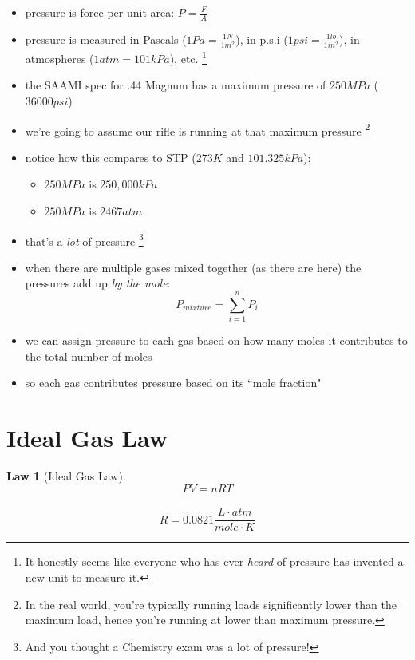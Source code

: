 \documentclass[11pt, oneside]{article}   	%
\newtheorem{law}{Law}
\begin{document}
\begin{itemize}

\item pressure is force per unit area: $P = \frac{F}{A}$
\item pressure is measured in Pascals ($1 Pa = \frac{1 N}{1 m^{2}}$), in p.s.i ($1 psi = \frac{1 lb}{1 in^{2}}$), in atmospheres ($1 atm = 101 kPa$), etc.
\footnote{It honestly seems like everyone who has ever \emph{heard} of pressure has invented a new unit to measure it.}
\item the SAAMI spec for .44 Magnum has a maximum pressure of  $250 MPa$ ($36000 psi$) 
\item we're going to assume our rifle is running at that maximum pressure
\footnote{In the real world, you're typically running loads significantly lower than the maximum load, hence you're running at lower than maximum pressure.}
\item notice how this compares to STP ($273 K$ and $101.325 kPa$):
\begin{itemize}
\item $250 MPa$ is $250,000 kPa$
\item $250 MPa$ is $2467 atm$
\end{itemize}

\item that's a \emph{lot} of pressure
\footnote{And you thought a Chemistry exam was a lot of pressure!}
\item when there are multiple gases mixed together (as there are here) the pressures add up \emph{by the mole}:\\
$$P_{mixture} = \sum^{n}_{i=1} P_{i} $$
\item we can assign pressure to each gas based on how many moles it contributes to the total number of moles
\item so each gas contributes pressure based on its ``mole fraction"
\end{itemize}

\section{Ideal Gas Law}

\begin{law}[Ideal Gas Law]\label{law:ideal-gas}
$$P V = n R T$$ \\
$$ R = 0.0821 \frac{L \cdot atm}{mole \cdot K}$$
\end{law}
\end{document}
